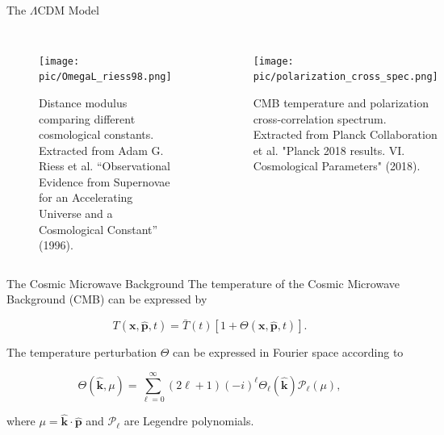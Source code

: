 \documentclass[serif, aspectratio=169]{beamer}
\begin{document}
\begin{frame}{The $\Lambda$CDM Model}
	\begin{columns}[t]
	
	\begin{figure}[t]
	\centering
	\texttt{[image: pic/OmegaL\_riess98.png]}
	\caption{Distance modulus comparing different cosmological constants. Extracted from Adam G. Riess et al. “Observational Evidence from Supernovae for an Accelerating Universe and a Cosmological Constant” (1996).}
	\label{fig:riess_OmegaL}
	\end{figure}
	
	\begin{figure}[t]
	\centering
	\texttt{[image: pic/polarization\_cross\_spec.png]}
	\caption{CMB temperature and polarization cross-correlation spectrum. Extracted from Planck Collaboration et al. "Planck 2018 results. VI. Cosmological Parameters" (2018).}	
	\label{fig:cte_planck}
	\end{figure}
	
	\end{columns}
\end{frame}

\begin{frame}{The Cosmic Microwave Background}
    The temperature of the Cosmic Microwave Background (CMB) can be expressed by

    \begin{equation}\label{eq:temp_def}
        T(\mathbf{x}, \hat{\mathbf{p}}, t)=\bar{T}(t)[1+\Theta(\mathbf{x}, \hat{\mathbf{p}}, t)].
    \end{equation}

    The temperature perturbation $\Theta$ can be expressed in Fourier space according to

    \begin{equation}\label{eq:Theta_expand}
        \Theta(\hat{\mathbf{k}}, \mu)=\sum_{\ell=0}^\infty (2\ell+1)(-i)^\ell \Theta_\ell(\hat{\mathbf{k}})\mathcal{P}_\ell(\mu),
    \end{equation}

    where $\mu=\hat{\mathbf{k}}\cdot \hat{\mathbf{p}}$ and $\mathcal{P}_\ell$ are Legendre polynomials.

\end{frame}
\end{document}
